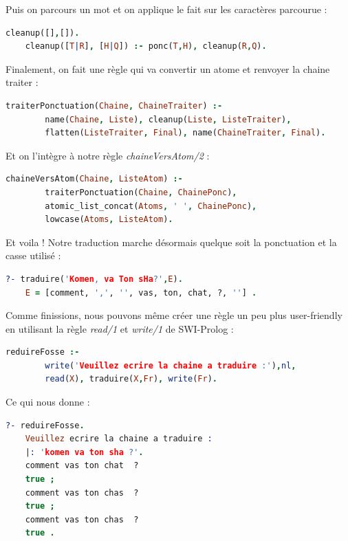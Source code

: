 \documentclass[11pt]{report}
\begin{document}
	Puis on parcours un mot et on applique le fait sur les caractères parcourue :
	\begin{lstlisting}[language=Prolog]
	cleanup([],[]).
	cleanup([T|R], [H|Q]) :- ponc(T,H), cleanup(R,Q).
	\end{lstlisting}
	
	Finalement, on fait une règle qui va convertir un atome et renvoyer la chaine traiter :
	\begin{lstlisting}[language=Prolog]
	traiterPonctuation(Chaine, ChaineTraiter) :-
		name(Chaine, Liste), cleanup(Liste, ListeTraiter),
		flatten(ListeTraiter, Final), name(ChaineTraiter, Final).
	\end{lstlisting}
	
	Et on l'intègre à notre règle {\em chaineVersAtom/2} :
	\begin{lstlisting}[language=Prolog]
	chaineVersAtom(Chaine, ListeAtom) :-
		traiterPonctuation(Chaine, ChainePonc),
		atomic_list_concat(Atoms, ' ', ChainePonc),
		lowcase(Atoms, ListeAtom).
	\end{lstlisting}
	
	Et voila ! Notre traduction marche désormais quelque soit la ponctuation et la casse utilisé :
	\begin{lstlisting}[language=Prolog]
	?- traduire('Komen, va Ton sHa?',E).
	E = [comment, ',', '', vas, ton, chat, ?, ''] .
	\end{lstlisting}
	
	Comme finissions, nous pouvons même créer une règle un peu plus user-friendly en utilisant la règle {\em read/1} et {\em write/1} de SWI-Prolog :
	\begin{lstlisting}[language=Prolog]
	reduireFosse :-
		write('Veuillez ecrire la chaine a traduire :'),nl,
		read(X), traduire(X,Fr), write(Fr).
	\end{lstlisting}
	
	Ce qui nous donne :
	\begin{lstlisting}[language=Prolog]
	?- reduireFosse.
	Veuillez ecrire la chaine a traduire :
	|: 'komen va ton sha ?'.
	comment vas ton chat  ?  
	true ;
	comment vas ton chas  ?  
	true ;
	comment vas ton chas  ?  
	true .
	\end{lstlisting}
	
\end{document}
